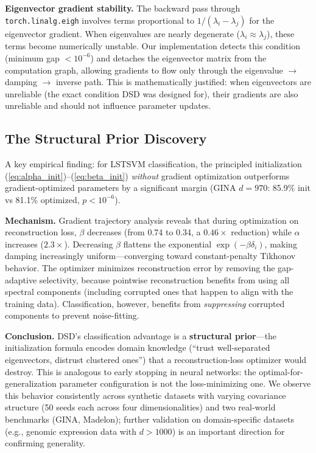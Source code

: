 \documentclass[preprint,review,12pt]{elsarticle}
\begin{document}
\textbf{Eigenvector gradient stability.} The backward pass through \texttt{torch.linalg.eigh} involves terms proportional to $1/(\lambda_i - \lambda_j)$ for the eigenvector gradient. When eigenvalues are nearly degenerate ($\lambda_i \approx \lambda_j$), these terms become numerically unstable. Our implementation detects this condition (minimum gap $< 10^{-6}$) and detaches the eigenvector matrix from the computation graph, allowing gradients to flow only through the eigenvalue $\to$ damping $\to$ inverse path. This is mathematically justified: when eigenvectors are unreliable (the exact condition DSD was designed for), their gradients are also unreliable and should not influence parameter updates.

\subsection{The Structural Prior Discovery}
\label{sec:structural_prior}

A key empirical finding: for LSTSVM classification, the principled initialization (\ref{eq:alpha_init})--(\ref{eq:beta_init}) \emph{without} gradient optimization outperforms gradient-optimized parameters by a significant margin (GINA $d{=}970$: 85.9\% init vs 81.1\% optimized, $p < 10^{-6}$).

\textbf{Mechanism.} Gradient trajectory analysis reveals that during optimization on reconstruction loss, $\beta$ decreases (from 0.74 to 0.34, a $0.46\times$ reduction) while $\alpha$ increases ($2.3\times$). Decreasing $\beta$ flattens the exponential $\exp(-\beta\delta_i)$, making damping increasingly uniform---converging toward constant-penalty Tikhonov behavior. The optimizer minimizes reconstruction error by removing the gap-adaptive selectivity, because pointwise reconstruction benefits from using all spectral components (including corrupted ones that happen to align with the training data). Classification, however, benefits from \emph{suppressing} corrupted components to prevent noise-fitting.

\textbf{Conclusion.} DSD's classification advantage is a \textbf{structural prior}---the initialization formula encodes domain knowledge (``trust well-separated eigenvectors, distrust clustered ones'') that a reconstruction-loss optimizer would destroy. This is analogous to early stopping in neural networks: the optimal-for-generalization parameter configuration is not the loss-minimizing one. We observe this behavior consistently across synthetic datasets with varying covariance structure (50 seeds each across four dimensionalities) and two real-world benchmarks (GINA, Madelon); further validation on domain-specific datasets (e.g., genomic expression data with $d > 1000$) is an important direction for confirming generality.
\end{document}
